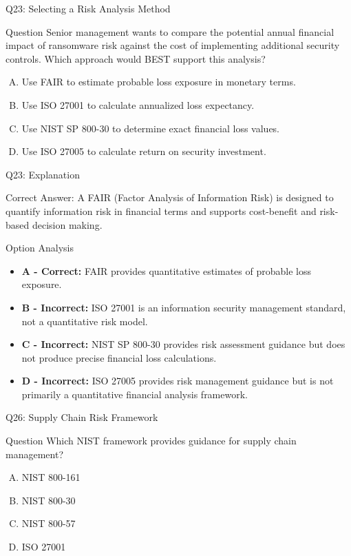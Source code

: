 \documentclass{beamer}
\begin{document}
	
	\begin{frame}{Q23: Selecting a Risk Analysis Method} \begin{block}{Question} Senior management wants to compare the potential annual financial impact of ransomware risk against the cost of implementing additional security controls. Which approach would BEST support this analysis? \end{block} \begin{enumerate}[(A)] \item Use FAIR to estimate probable loss exposure in monetary terms. \item Use ISO 27001 to calculate annualized loss expectancy. \item Use NIST SP 800-30 to determine exact financial loss values. \item Use ISO 27005 to calculate return on security investment. \end{enumerate} \end{frame} \begin{frame}{Q23: Explanation} \begin{block}{Correct Answer: A} FAIR (Factor Analysis of Information Risk) is designed to quantify information risk in financial terms and supports cost-benefit and risk-based decision making. \end{block} \begin{block}{Option Analysis} \begin{itemize} \item \textbf{A - Correct:} FAIR provides quantitative estimates of probable loss exposure. \item \textbf{B - Incorrect:} ISO 27001 is an information security management standard, not a quantitative risk model. \item \textbf{C - Incorrect:} NIST SP 800-30 provides risk assessment guidance but does not produce precise financial loss calculations. \item \textbf{D - Incorrect:} ISO 27005 provides risk management guidance but is not primarily a quantitative financial analysis framework. \end{itemize} \end{block} \end{frame}
	

	
	\begin{frame}{Q26: Supply Chain Risk Framework}
		\begin{block}{Question}
			Which NIST framework provides guidance for supply chain management?
		\end{block}
		\begin{enumerate}[(A)]
			\item NIST 800-161
			\item NIST 800-30
			\item NIST 800-57
			\item ISO 27001
		\end{enumerate}
	\end{frame}
	
\end{document}
